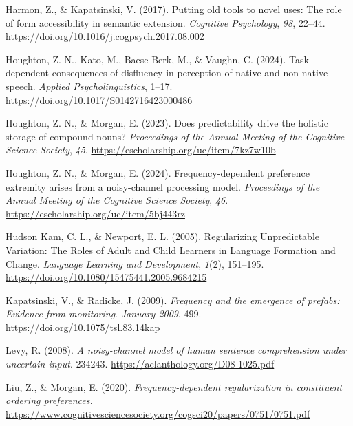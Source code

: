 \documentclass[
  12pt,
]{scrartcl}
\newlength{\cslhangindent}
\newenvironment{CSLReferences}[2] %
 {\begin{list}{}{%
  \setlength{\itemindent}{0pt}
  \setlength{\leftmargin}{0pt}
  \setlength{\parsep}{0pt}
  \ifodd #1
   \setlength{\leftmargin}{\cslhangindent}
   \setlength{\itemindent}{-1\cslhangindent}
  \fi
  \setlength{\itemsep}{#2\baselineskip}}}
 {\end{list}}
\begin{document}
\begin{CSLReferences}{1}{0}
Harmon, Z., \& Kapatsinski, V. (2017). Putting old tools to novel uses:
The role of form accessibility in semantic extension. \emph{Cognitive
Psychology}, \emph{98}, 22--44.
\url{https://doi.org/10.1016/j.cogpsych.2017.08.002}

Houghton, Z. N., Kato, M., Baese-Berk, M., \& Vaughn, C. (2024).
Task-dependent consequences of disfluency in perception of native and
non-native speech. \emph{Applied Psycholinguistics}, 1--17.
\url{https://doi.org/10.1017/S0142716423000486}

Houghton, Z. N., \& Morgan, E. (2023). Does predictability drive the
holistic storage of compound nouns? \emph{Proceedings of the Annual
Meeting of the Cognitive Science Society}, \emph{45}.
\url{https://escholarship.org/uc/item/7kz7w10b}

Houghton, Z. N., \& Morgan, E. (2024). Frequency-dependent preference
extremity arises from a noisy-channel processing model.
\emph{Proceedings of the Annual Meeting of the Cognitive Science
Society}, \emph{46}. \url{https://escholarship.org/uc/item/5bj443rz}

Hudson Kam, C. L., \& Newport, E. L. (2005). Regularizing Unpredictable
Variation: The Roles of Adult and Child Learners in Language Formation
and Change. \emph{Language Learning and Development}, \emph{1}(2),
151--195. \url{https://doi.org/10.1080/15475441.2005.9684215}

Kapatsinski, V., \& Radicke, J. (2009). \emph{Frequency and the
emergence of prefabs: Evidence from monitoring}. \emph{January 2009},
499. \url{https://doi.org/10.1075/tsl.83.14kap}

Levy, R. (2008). \emph{A noisy-channel model of human sentence
comprehension under uncertain input}. 234243.
\url{https://aclanthology.org/D08-1025.pdf}

Liu, Z., \& Morgan, E. (2020). \emph{Frequency-dependent regularization
in constituent ordering preferences.}
\url{https://www.cognitivesciencesociety.org/cogsci20/papers/0751/0751.pdf}


\end{CSLReferences}
\end{document}
